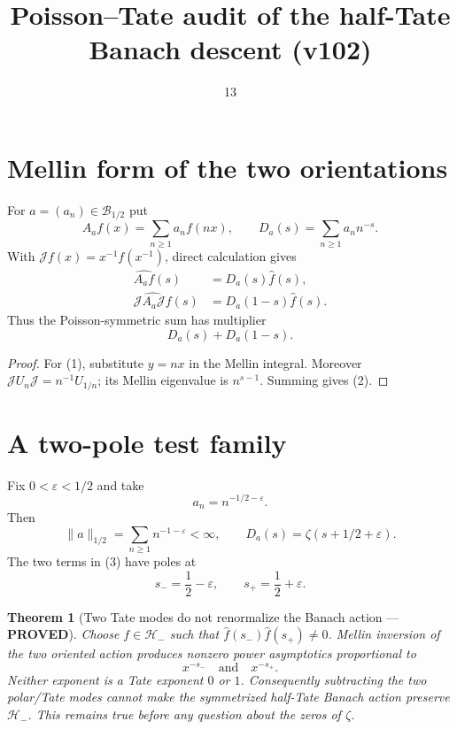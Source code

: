 \documentclass[11pt]{article}
\title{Poisson--Tate audit of the half-Tate Banach descent (v102)}
\date{13}
\newcommand{\PROVED}{\textcolor{green!40!black}{\textbf{PROVED}}}
\newtheorem{theorem}{Theorem}
\begin{document}
\maketitle

\section{Mellin form of the two orientations}

For $a=(a_n)\in\mathcal B_{1/2}$ put
\[
 A_af(x)=\sum_{n\ge1}a_nf(nx),\qquad
 D_a(s)=\sum_{n\ge1}a_nn^{-s}.
\]
With $\mathscr Jf(x)=x^{-1}f(x^{-1})$, direct calculation gives
\begin{align}
 \widehat{A_af}(s)&=D_a(s)\widehat f(s),             \tag{1}\\
 \widehat{\mathscr JA_a\mathscr Jf}(s)
     &=D_a(1-s)\widehat f(s).                        \tag{2}
\end{align}
Thus the Poisson-symmetric sum has multiplier
\begin{equation}
                         D_a(s)+D_a(1-s).             \tag{3}
\end{equation}

\begin{proof}
For (1), substitute $y=nx$ in the Mellin integral.  Moreover
$\mathscr JU_n\mathscr J=n^{-1}U_{1/n}$; its Mellin eigenvalue is
$n^{s-1}$.  Summing gives (2).
\end{proof}

\section{A two-pole test family}

Fix $0<\varepsilon<1/2$ and take
\begin{equation}
                         a_n=n^{-1/2-\varepsilon}.    \tag{4}
\end{equation}
Then
\[
 \|a\|_{1/2}=\sum_{n\ge1}n^{-1-\varepsilon}<\infty,
 \qquad D_a(s)=\zeta(s+1/2+\varepsilon).             \tag{5}
\]
The two terms in (3) have poles at
\begin{equation}
 s_-=\frac12-\varepsilon,
 \qquad s_+=\frac12+\varepsilon.                    \tag{6}
\end{equation}

\begin{theorem}[Two Tate modes do not renormalize the Banach action ---
\PROVED]
Choose $f\in\mathcal H_-$ such that
$\widehat f(s_-)\widehat f(s_+)\ne0$.  Mellin inversion of the two
oriented action produces nonzero power asymptotics proportional to
\begin{equation}
                 x^{-s_-}\quad\text{and}\quad x^{-s_+}.        \tag{7}
\end{equation}
Neither exponent is a Tate exponent $0$ or $1$.  Consequently subtracting
the two polar/Tate modes cannot make the symmetrized half-Tate Banach action
preserve $\mathcal H_-$.  This remains true before any question about the
zeros of $\zeta$.
\end{theorem}
\end{document}
